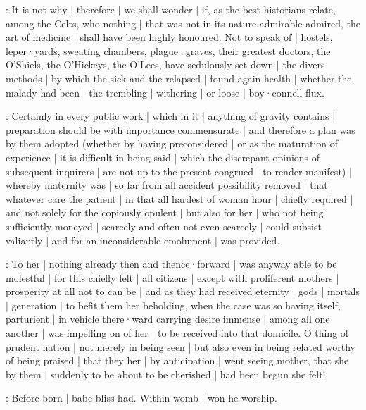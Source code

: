 
:
It is not why |
therefore |
we shall wonder |
if,
as the best historians relate,
among the Celts,
who nothing |
that was not in its nature admirable admired,
the art of medicine |
shall have been highly honoured.
Not to speak of |
hostels,
leper·yards,
sweating chambers,
plague·graves,
their greatest doctors,
the O'Shiels,
the O'Hickeys,
the O'Lees,
have sedulously set down |
the divers methods |
by which the sick and the relapsed |
found again health |
whether the malady had been |
the trembling |
withering |
or loose |
boy·connell flux.

\begin{omitted}

:
Certainly in every public work |
which in it |
anything of gravity contains |
preparation should be with importance commensurate |
and therefore a plan was by them adopted
(whether by having preconsidered |
or as the maturation of experience |
it is difficult in being said |
which the discrepant opinions of subsequent inquirers |
are not up to the present congrued |
to render manifest) |
whereby maternity was |
so far from all accident possibility removed |
that whatever care the patient |
in that all hardest of woman hour |
chiefly required |
and not solely for the copiously opulent |
but also for her |
who not being sufficiently moneyed |
scarcely and often not even scarcely |
could subsist valiantly |
and for an inconsiderable emolument |
was provided.

:
To her |
nothing already then and thence·forward |
was anyway able to be molestful |
for this chiefly felt |
all citizens |
except with proliferent mothers |
prosperity at all not to can be |
and as they had received eternity |
gods |
mortals |
generation |
to befit them her beholding,
when the case was so having itself,
parturient |
in vehicle there·ward carrying desire immense |
among all one another |
was impelling on of her |
to be received into that domicile.
O thing of prudent nation |
not merely in being seen |
but also even in being related worthy of being praised |
that they her |
by anticipation |
went seeing mother,
that she by them |
suddenly to be about to be cherished |
had been begun she felt!

\end{omitted}



:
Before born |
babe bliss had.
Within womb |
won he worship.

